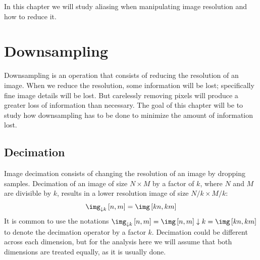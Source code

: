 In this chapter we will study aliasing when manipulating image resolution and how to reduce it.


\section{Downsampling}

Downsampling is an operation that consists of reducing the resolution of an image. When we reduce the resolution, some information will be lost; specifically fine image details will be lost. But carelessly removing pixels will produce a greater loss of information than necessary. The goal of this chapter will be to study how downsampling has to be done to minimize the amount of information lost.


\subsection{Decimation}

Image decimation consists of changing the resolution of an image by dropping samples. Decimation of an image of size $N \times M$ by a factor of $k$, where $N$ and $M$ are divisible by $k$, results in a lower resolution image of size $N/k \times M/k$:
\begin{equation}
	\img_{\downarrow k} \left[n,m\right]  = \img \left[kn, km\right]
\end{equation}
It is common to use the notations $\img_{\downarrow k} \left[n,m\right]   = \img \left[n,m\right] \downarrow k = \img \left[kn,km\right]$ to denote the decimation operator by a factor $k$. Decimation could be different across each dimension, but for the analysis here we will assume that both dimensions are treated equally, as it is usually done.



